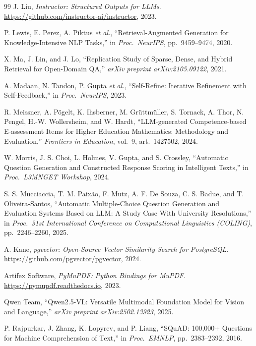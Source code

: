 \documentclass[12pt, a4paper]{article}
\begin{document}
\begin{thebibliography}{99}
  J. Liu,
  \textit{Instructor: Structured Outputs for LLMs}.
  \url{https://github.com/instructor-ai/instructor}, 2023.

  P. Lewis, E. Perez, A. Piktus \textit{et al.},
  ``Retrieval-Augmented Generation for Knowledge-Intensive NLP Tasks,''
  in \textit{Proc.\ NeurIPS}, pp.~9459--9474, 2020.

  X. Ma, J. Lin, and J. Lo,
  ``Replication Study of Sparse, Dense, and Hybrid Retrieval for Open-Domain QA,''
  \textit{arXiv preprint arXiv:2105.09122}, 2021.

  A. Madaan, N. Tandon, P. Gupta \textit{et al.},
  ``Self-Refine: Iterative Refinement with Self-Feedback,''
  in \textit{Proc.\ NeurIPS}, 2023.

  R. Meissner, A. P\"ogelt, K. Ihsberner, M. Gr\"uttm\"uller, S. Tornack,
  A. Thor, N. Pengel, H.-W. Wollersheim, and W. Hardt,
  ``LLM-generated Competence-based E-assessment Items for Higher Education
  Mathematics: Methodology and Evaluation,''
  \textit{Frontiers in Education}, vol.~9, art.~1427502, 2024.

  W. Morris, J. S. Choi, L. Holmes, V. Gupta, and S. Crossley,
  ``Automatic Question Generation and Constructed Response Scoring in
  Intelligent Texts,''
  in \textit{Proc.\ L3MNGET Workshop}, 2024.

  S. S. Mucciaccia, T. M. Paix\~ao, F. Mutz, A. F. De Souza, C. S. Badue,
  and T. Oliveira-Santos,
  ``Automatic Multiple-Choice Question Generation and Evaluation Systems
  Based on LLM: A Study Case With University Resolutions,''
  in \textit{Proc.\ 31st International Conference on Computational Linguistics
  (COLING)}, pp.~2246--2260, 2025.

  A. Kane,
  \textit{pgvector: Open-Source Vector Similarity Search for PostgreSQL}.
  \url{https://github.com/pgvector/pgvector}, 2024.

  Artifex Software,
  \textit{PyMuPDF: Python Bindings for MuPDF}.
  \url{https://pymupdf.readthedocs.io}, 2023.

  Qwen Team,
  ``Qwen2.5-VL: Versatile Multimodal Foundation Model for Vision and Language,''
  \textit{arXiv preprint arXiv:2502.13923}, 2025.

  P. Rajpurkar, J. Zhang, K. Lopyrev, and P. Liang,
  ``SQuAD: 100,000+ Questions for Machine Comprehension of Text,''
  in \textit{Proc.\ EMNLP}, pp.~2383--2392, 2016.


\end{thebibliography}
\end{document}
